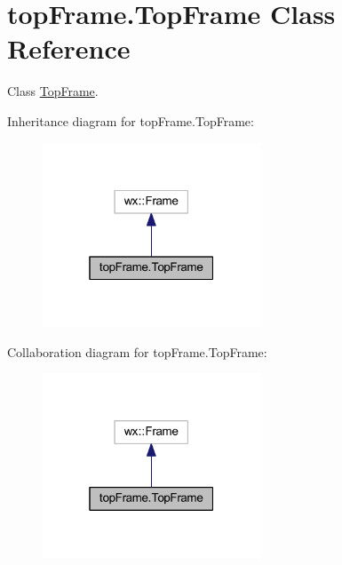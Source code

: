 \hypertarget{classtop_frame_1_1_top_frame}{\section{top\-Frame.\-Top\-Frame Class Reference}
\label{classtop_frame_1_1_top_frame}
}


Class \hyperlink{classtop_frame_1_1_top_frame}{Top\-Frame}.  




Inheritance diagram for top\-Frame.\-Top\-Frame\-:\nopagebreak
\begin{figure}[H]
\begin{center}
\leavevmode
\includegraphics[width=184pt]{classtop_frame_1_1_top_frame__inherit__graph}
\end{center}
\end{figure}


Collaboration diagram for top\-Frame.\-Top\-Frame\-:\nopagebreak
\begin{figure}[H]
\begin{center}
\leavevmode
\includegraphics[width=184pt]{classtop_frame_1_1_top_frame__coll__graph}
\end{center}
\end{figure}
